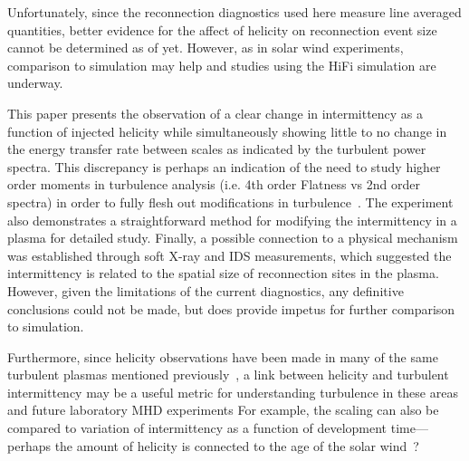 \documentclass[aip,prl,amsmath,amssymb,reprint,superscriptaddress]{revtex4-1} %
\begin{document}
Unfortunately, since the reconnection diagnostics used here measure line averaged quantities, better evidence for the affect of helicity on reconnection event size cannot be determined as of yet. However, as in solar wind experiments, comparison to simulation may help and studies using the HiFi simulation are underway.

This paper presents the observation of a clear change in intermittency as a function of injected helicity while simultaneously showing little to no change in the energy transfer rate between scales as indicated by the turbulent power spectra. This discrepancy is perhaps an indication of the need to study higher order moments in turbulence analysis (i.e. 4th order Flatness vs 2nd order spectra) in order to fully flesh out modifications in turbulence~\cite{matthaeusVelli11}. The experiment also demonstrates a straightforward method for modifying the intermittency in a plasma for detailed study. Finally, a possible connection to a physical mechanism was established through soft X-ray and IDS measurements, which suggested the intermittency is related to the spatial size of reconnection sites in the plasma. However, given the limitations of the current diagnostics, any definitive conclusions could not be made, but does provide impetus for further comparison to simulation.

Furthermore, since helicity observations have been made in many of the same turbulent plasmas mentioned previously~\cite{goldstein94, ji95, telloni12}, a link between helicity and turbulent intermittency may be a useful metric for understanding turbulence in these areas and future laboratory MHD experiments For example, the scaling can also be compared to variation of intermittency as a function of development time---perhaps the amount of helicity is connected to the age of the solar wind~\cite{greco12}?

\end{document}
